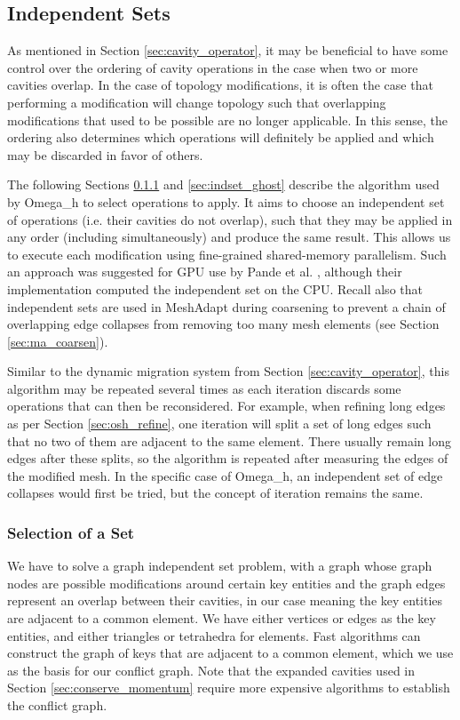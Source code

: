 \subsection{Independent Sets}
\label{sec:indset}

As mentioned in Section \ref{sec:cavity_operator}, it may be beneficial
to have some control over the ordering of cavity operations in the
case when two or more cavities overlap.
In the case of topology modifications, it is often the case that
performing a modification will change topology such that overlapping
modifications that used to be possible are no longer applicable.
In this sense, the ordering also determines which operations will
definitely be applied and which may be discarded in favor of others.

The following Sections \ref{sec:indset_select} and \ref{sec:indset_ghost}
describe the algorithm used by Omega\_h to select operations to apply.
It aims to choose an independent set of operations (i.e. their cavities
do not overlap), such that they may be applied in
any order (including simultaneously) and produce the same result.
This allows us to execute each modification using fine-grained
shared-memory parallelism.
Such an approach was suggested for GPU use by Pande et al. \cite{pandea2015gpu},
although their implementation computed the independent set on the CPU.
Recall also that independent sets are used in MeshAdapt \cite{de1999parallel}
during coarsening to prevent a chain of overlapping edge collapses
from removing too many mesh elements (see Section \ref{sec:ma_coarsen}).

Similar to the dynamic migration system from Section \ref{sec:cavity_operator},
this algorithm may be repeated several times as each iteration
discards some operations that can then be reconsidered.
For example, when refining long edges as per Section \ref{sec:osh_refine},
one iteration will split a set of long edges such that no two of them
are adjacent to the same element.
There usually remain long edges after these splits, so the algorithm
is repeated after measuring the edges of the modified mesh.
In the specific case of Omega\_h, an independent set of edge collapses
would first be tried, but the concept of iteration remains the same.

\subsubsection{Selection of a Set}
\label{sec:indset_select}

We have to solve a graph independent set problem, with a graph whose
graph nodes are possible modifications around certain key entities
and the graph edges represent an overlap between their cavities,
in our case meaning the key entities are adjacent to a common element.
We have either vertices or edges as the key entities, and either
triangles or tetrahedra for elements.
Fast algorithms can construct the graph of keys that are adjacent
to a common element, which we use as the basis for our conflict graph.
Note that the expanded cavities used in Section \ref{sec:conserve_momentum}
require more expensive algorithms to establish the conflict graph.

